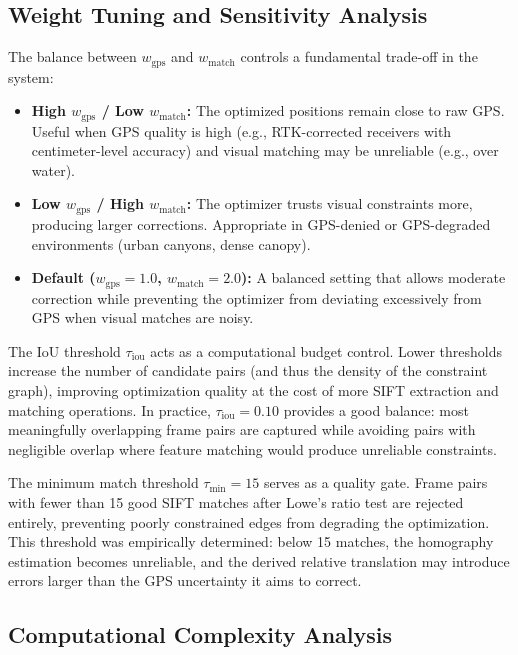 \documentclass[conference]{IEEEtran}
\begin{document}
\subsection{Weight Tuning and Sensitivity Analysis}

The balance between $w_{\text{gps}}$ and $w_{\text{match}}$ controls a fundamental trade-off in the system:

\begin{itemize}
    \item \textbf{High $w_{\text{gps}}$ / Low $w_{\text{match}}$:} The optimized positions remain close to raw GPS. Useful when GPS quality is high (e.g., RTK-corrected receivers with centimeter-level accuracy) and visual matching may be unreliable (e.g., over water).
    \item \textbf{Low $w_{\text{gps}}$ / High $w_{\text{match}}$:} The optimizer trusts visual constraints more, producing larger corrections. Appropriate in GPS-denied or GPS-degraded environments (urban canyons, dense canopy).
    \item \textbf{Default ($w_{\text{gps}} = 1.0$, $w_{\text{match}} = 2.0$):} A balanced setting that allows moderate correction while preventing the optimizer from deviating excessively from GPS when visual matches are noisy.
\end{itemize}

The IoU threshold $\tau_{\text{iou}}$ acts as a computational budget control. Lower thresholds increase the number of candidate pairs (and thus the density of the constraint graph), improving optimization quality at the cost of more SIFT extraction and matching operations. In practice, $\tau_{\text{iou}} = 0.10$ provides a good balance: most meaningfully overlapping frame pairs are captured while avoiding pairs with negligible overlap where feature matching would produce unreliable constraints.

The minimum match threshold $\tau_{\text{min}} = 15$ serves as a quality gate. Frame pairs with fewer than 15 good SIFT matches after Lowe's ratio test are rejected entirely, preventing poorly constrained edges from degrading the optimization. This threshold was empirically determined: below 15 matches, the homography estimation becomes unreliable, and the derived relative translation may introduce errors larger than the GPS uncertainty it aims to correct.

\subsection{Computational Complexity Analysis}
\end{document}

